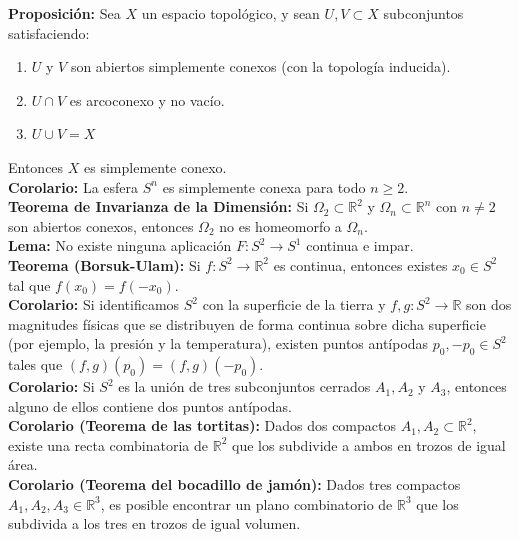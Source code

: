 \documentclass{article}
\begin{document}
\textbf{Proposición:} Sea $X$ un espacio topológico, y sean $U,V\subset X$ subconjuntos satisfaciendo:
\begin{enumerate}
\item $U$ y $V$ son abiertos simplemente conexos (con la topología inducida).

\item $U\cap V$ es arcoconexo y no vacío.

\item $U\cup V=X$
\end{enumerate}
Entonces $X$ es simplemente conexo.\\

\textbf{Corolario:} La esfera $S^n$ es simplemente conexa para todo $n\geq 2$. \\

\textbf{Teorema de Invarianza de la Dimensión:} Si $\Omega_2\subset \mathbb{R}^2$ y $\Omega_n\subset \mathbb{R}^n$ con $n\neq 2$ son abiertos conexos, entonces $\Omega_2$ no es homeomorfo a $\Omega_n$.\\

\textbf{Lema:} No existe ninguna aplicación $F:S^2\rightarrow S^1$ continua e impar. \\

\textbf{Teorema (Borsuk-Ulam):} Si $f:S^2\rightarrow \mathbb{R}^2$ es continua, entonces existes $x_0\in S^2$ tal que $f(x_0)=f(-x_0)$. \\

\textbf{Corolario:} Si identificamos $S^2$ con la superficie de la tierra y $f,g:S^2\rightarrow \mathbb{R}$ son dos magnitudes físicas que se distribuyen de forma continua sobre dicha superficie (por ejemplo, la presión y la temperatura), existen puntos antípodas $p_0,-p_0\in S^2$ tales que $(f,g)(p_0)=(f,g)(-p_0)$.\\

\textbf{Corolario:} Si $S^2$ es la unión de tres subconjuntos cerrados $A_1,A_2$ y $A_3$, entonces alguno de ellos contiene dos puntos antípodas.\\

\textbf{Corolario (Teorema de las tortitas):} Dados dos compactos $A_1,A_2\subset \mathbb{R}^2$, existe una recta combinatoria de $\mathbb{R}^2$ que los subdivide a ambos en trozos de igual área. \\

\textbf{Corolario (Teorema del bocadillo de jamón):} Dados tres compactos $A_1,A_2,A_3\in \mathbb{R}^3$, es posible encontrar un plano combinatorio de $\mathbb{R}^3$ que los subdivida a los tres en trozos de igual volumen. \\
\end{document}
